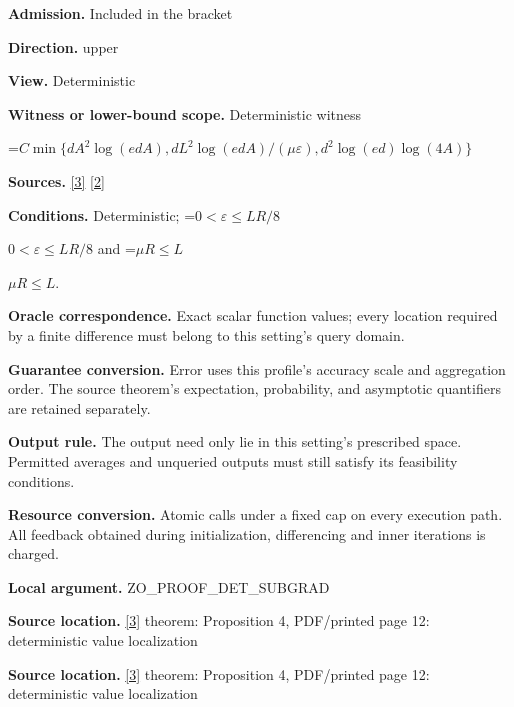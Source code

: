 \documentclass[10pt,a4paper]{article}
\newcommand{\AtlasMath}[1]{\par\begingroup\centering\setbox0=\hbox{$\displaystyle #1$}\ifdim\wd0>1.4\linewidth\typeout{ATLAS WIDE FORMULA: \the\wd0}\fi\ifdim\wd0>\linewidth\resizebox{\linewidth}{!}{\box0}\else\box0\fi\par\endgroup}
\newcommand{\AtlasInlineMath}[1]{\begingroup\setbox0=\hbox{$#1$}\ifdim\wd0>.4\linewidth\endgroup\AtlasMath{#1}\else\endgroup$#1$\fi}
\begin{document}
\textbf{Admission.} Included in the bracket



\textbf{Direction.} upper



\textbf{View.} Deterministic



\textbf{Witness or lower-bound scope.} Deterministic witness



\AtlasMath{C\min\{dA^2\log(edA),dL^2\log(edA)/(\mu\varepsilon),d^2\log(ed)\log(4A)\}}


\textbf{Sources.} \href{https://arxiv.org/html/2607.16558v2}{[3]} \href{https://www.mathnet.ru/php/archive.phtml?jrnid=mzm&option_lang=eng&paperid=1697&wshow=paper}{[2]}



\textbf{Conditions.} Deterministic; \AtlasInlineMath{0<\varepsilon\le LR/8} and \AtlasInlineMath{\mu R\le L}.



\textbf{Oracle correspondence.} Exact scalar function values; every location required by a finite difference must belong to this setting's query domain.



\textbf{Guarantee conversion.} Error uses this profile's accuracy scale and aggregation order. The source theorem's expectation, probability, and asymptotic quantifiers are retained separately.



\textbf{Output rule.} The output need only lie in this setting's prescribed space. Permitted averages and unqueried outputs must still satisfy its feasibility conditions.



\textbf{Resource conversion.} Atomic calls under a fixed cap on every execution path. All feedback obtained during initialization, differencing and inner iterations is charged.



\textbf{Local argument.} ZO\_PROOF\_DET\_SUBGRAD



\textbf{Source location.} \href{https://arxiv.org/html/2607.16558v2}{[3]} theorem: Proposition 4, PDF/printed page 12: deterministic value localization



\textbf{Source location.} \href{https://arxiv.org/html/2607.16558v2}{[3]} theorem: Proposition 4, PDF/printed page 12: deterministic value localization
\end{document}
